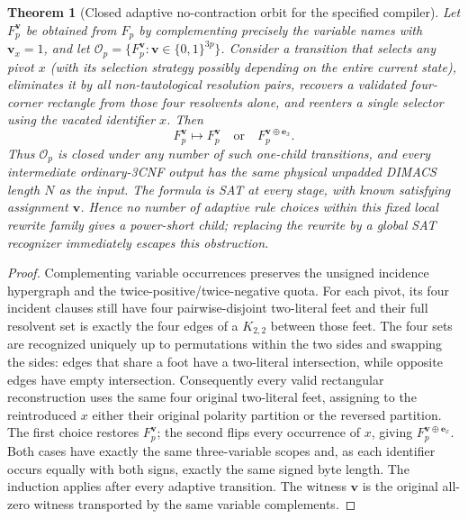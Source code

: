 \documentclass[11pt]{article}
\newtheorem{theorem}{Theorem}
\begin{document}
\begin{theorem}[Closed adaptive no-contraction orbit for the specified compiler]
Let $F_p^{\mathbf v}$ be obtained from $F_p$ by complementing precisely the variable names with $\mathbf v_x=1$, and let $\mathcal O_p=\{F_p^{\mathbf v}:\mathbf v\in\{0,1\}^{3p}\}$. Consider a transition that selects \emph{any} pivot $x$ (with its selection strategy possibly depending on the entire current state), eliminates it by all non-tautological resolution pairs, recovers a validated four-corner rectangle from those four resolvents alone, and reenters a single selector using the vacated identifier $x$. Then
\[
 F_p^{\mathbf v}\longmapsto F_p^{\mathbf v}\quad\text{or}\quad F_p^{\mathbf v\oplus\mathbf e_x}.
\]
Thus $\mathcal O_p$ is closed under any number of such one-child transitions, and every intermediate ordinary-3CNF output has the \emph{same physical unpadded DIMACS length} $N$ as the input. The formula is SAT at every stage, with known satisfying assignment $\mathbf v$. Hence no number of adaptive rule choices \emph{within this fixed local rewrite family} gives a power-short child; replacing the rewrite by a global SAT recognizer immediately escapes this obstruction.
\end{theorem}
\begin{proof}
Complementing variable occurrences preserves the unsigned incidence hypergraph and the twice-positive/twice-negative quota. For each pivot, its four incident clauses still have four pairwise-disjoint two-literal feet and their full resolvent set is exactly the four edges of a $K_{2,2}$ between those feet. The four sets are recognized uniquely up to permutations within the two sides and swapping the sides: edges that share a foot have a two-literal intersection, while opposite edges have empty intersection. Consequently every valid rectangular reconstruction uses the same four original two-literal feet, assigning to the reintroduced $x$ either their original polarity partition or the reversed partition. The first choice restores $F_p^{\mathbf v}$; the second flips every occurrence of $x$, giving $F_p^{\mathbf v\oplus\mathbf e_x}$. Both cases have exactly the same three-variable scopes and, as each identifier occurs equally with both signs, exactly the same signed byte length. The induction applies after every adaptive transition. The witness $\mathbf v$ is the original all-zero witness transported by the same variable complements.
\end{proof}
\end{document}
